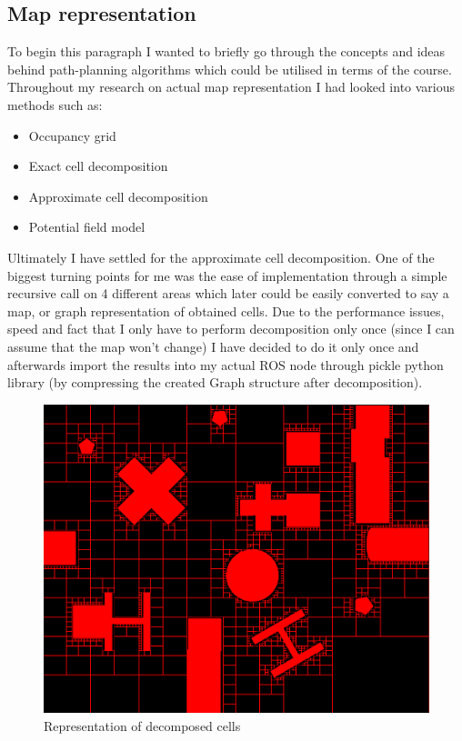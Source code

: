 \documentclass[a4paper]{article}
\begin{document}
\subsection{Map representation}
To begin this paragraph I wanted to briefly go through the concepts and ideas behind path-planning algorithms which could be utilised in terms of the course. Throughout my research on actual map representation I had looked into various methods such as:
\begin{itemize}
    \setlength\itemsep{0.1em}
    \item Occupancy grid
    \item Exact cell decomposition
    \item Approximate cell decomposition
    \item Potential field model
\end{itemize}
Ultimately I have settled for the approximate cell decomposition. One of the biggest turning points for me was the ease of implementation through a simple recursive call on 4 different areas which later could be easily converted to say a map, or graph representation of obtained cells. Due to the performance issues, speed and fact that I only have to perform decomposition only once (since I can assume that the map won't change) I have decided to do it only once and afterwards import the results into my actual ROS node through pickle python library (by compressing the created Graph structure after decomposition).
\begin{figure}[H]
    \centering
    \includegraphics[scale=0.105]{img1}
    \caption{Representation of decomposed cells}
\end{figure}
\end{document}
